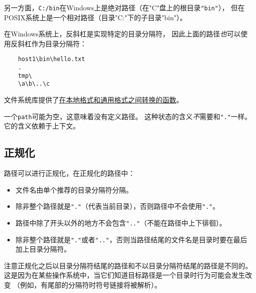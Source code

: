 另一方面，\texttt{C:/bin}在Windows上是绝对路径（在"C"盘上的根目录\texttt{"bin"}），
但在POSIX系统上是一个相对路径（目录"C:"下的子目录"bin"）。

在Windows系统上，反斜杠是实现特定的目录分隔符，
因此上面的路径\emph{也}可以使用反斜杠作为目录分隔符：
\begin{lstlisting}
    host1\bin\hello.txt
    .
    tmp\
    \a\b\..\c
\end{lstlisting}
文件系统库提供了\hyperref[ch20.3.4]{在本地格式和通用格式之间转换的函数}。

一个\texttt{path}可能为空，这意味着没有定义路径。
这种状态的含义\emph{不}需要和\texttt{"."}一样。它的含义依赖于上下文。

\subsection{正规化}
路径可以进行正规化，在正规化的路径中：
\begin{itemize}
    \item 文件名由单个推荐的目录分隔符分隔。
    \item 除非整个路径就是\texttt{"."}（代表当前目录），否则路径中不会使用\texttt{"."}。
    \item 路径中除了开头以外的地方不会包含\texttt{".."}（不能在路径中上下徘徊）。
    \item 除非整个路径就是\texttt{"."}或者\texttt{".."}，否则当路径结尾的文件名是目录时要在最后加上目录分隔符。
\end{itemize}
注意正规化之后以目录分隔符结尾的路径和不以目录分隔符结尾的路径是不同的。
这是因为在某些操作系统中，当它们知道目标路径是一个目录时行为可能会发生改变
（例如，有尾部的分隔符时符号链接将被解析）。

